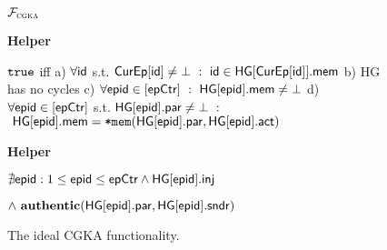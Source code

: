\begin{figure*}[!tbp]
\begin{systembox}{\normalsize$\mathcal{F}_{\normalfont\textsc{cgka}}$}
{\begin{minipage}[t]{0.49\linewidth}
    {\bf Helper \hgConsistent}
    \begin{algorithmic}
      \State \vspace*{-.6em} 
      \State \Return ${\normalfont\texttt{true}}$ iff
      \State \hspace*{1.5em} a) $\forall {\ensuremath{\mathsf{id}}}$ s.t. $\textsf{CurEp}[{\mathsf{id}}] \neq \bot \ : \ {\mathsf{id}} \in \mathsf{HG}[\textsf{CurEp}[{\mathsf{id}}]].\mathsf{mem}$
      \State \hspace*{1.5em} b) HG has no cycles
      \State \hspace*{1.5em} c) $\forall \hgnodeid \in [\hgnctr]\ :\ \setvert[\hgnodeid].\hgm\neq\bot$
      \State \hspace*{1.5em} d) $\forall {\normalfont\textsf{epid}} \in [\textsf{epCtr}]$ s.t. $\mathsf{HG}[{\normalfont\textsf{epid}}].\mathsf{par}\neq\bot\ :$\\\hspace*{4em} $\ \mathsf{HG}[{\normalfont\textsf{epid}}].\mathsf{mem} = {\textnormal{\tt*mem}}(\mathsf{HG}[{\normalfont\textsf{epid}}].\mathsf{par},\mathsf{HG}[{\normalfont\textsf{epid}}].\mathsf{act})$
    \end{algorithmic}

    \medskip
    {\bf Helper \authPreserved}
    \begin{algorithmic}
      \State \vspace*{-.6em}
      \State \Return $\nexists{\normalfont\textsf{epid}} :  1 \leq {\normalfont\textsf{epid}} \leq \textsf{epCtr} \land \mathsf{HG}[{\normalfont\textsf{epid}}].\textsf{inj}$ \\\strut\hfill $ \land\ \textnormal{\textbf{authentic}}(\mathsf{HG}[{\normalfont\textsf{epid}}].\mathsf{par}, \mathsf{HG}[{\normalfont\textsf{epid}}].\mathsf{sndr})$
    \end{algorithmic}

  \end{minipage}}
  \end{systembox}

  \caption{The ideal CGKA functionality.}\label{fig:CGKA-func-active-helpers}
\end{figure*}

